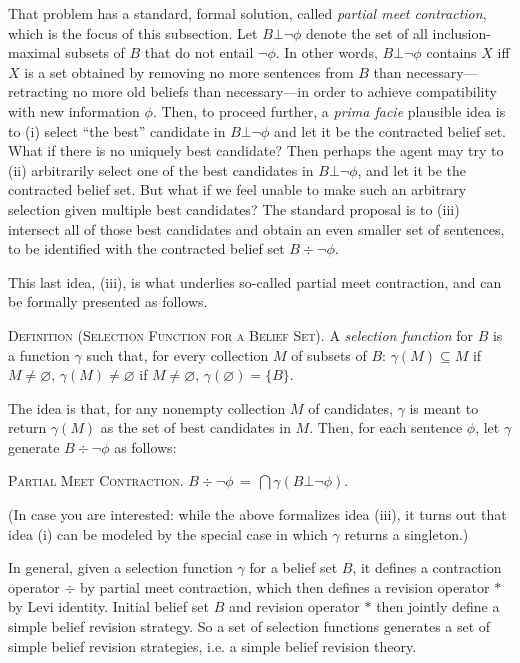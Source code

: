 That problem has a standard, formal solution, called {\em partial meet contraction}, which is the focus of this subsection. Let $B \bot \neg\phi$ denote the set of all inclusion-maximal subsets of $B$ that do not entail $\neg\phi$. In other words, $B \bot \neg\phi$ contains $X$ iff $X$ is a set obtained by removing no more sentences from $B$ than necessary---retracting no more old beliefs than necessary---in order to achieve compatibility with new information $\phi$. Then, to proceed further, a {\em prima facie} plausible idea is to (i) select ``the best'' candidate in $B \bot \neg\phi$ and let it be the contracted belief set.  What if there is no uniquely best candidate? Then perhaps the agent may try to (ii) arbitrarily select one of the best candidates in $B \bot \neg\phi$, and let it be the contracted belief set. But what if we feel unable to make such an arbitrary selection given multiple best candidates? The standard proposal is to (iii) intersect all of those best candidates and obtain an even smaller set of sentences, to be identified with the contracted belief set $B \div \neg\phi$.

This last idea, (iii), is what underlies so-called partial meet contraction, and can be formally presented as follows. \op

	\xm \textsc{Definition (Selection Function for a Belief Set).} A {\em selection function} for $B$ is a function $\gamma$ such that, for every collection $M$ of subsets of $B$: \op
		\im[(a)] $\gamma(M) \subseteq M$ if $M \neq \varnothing$,
		\im[(b)] $\gamma(M) \neq \varnothing$ if $M \neq \varnothing$,
		\im[(c)] $\gamma(\varnothing) = \{B\}$. 
	\ed

\ed The idea is that, for any nonempty collection $M$ of candidates, $\gamma$ is meant to return $\gamma(M)$ as the set of best candidates in $M$. Then, for each sentence $\phi$, let $\gamma$ generate $B \div \neg \phi$ as follows:\op

\xm \textsc{Partial Meet Contraction.} $B \div \neg \phi \,=\, \bigcap\gamma(B\bot\neg\phi)$.

\ed (In case you are interested: while the above formalizes idea (iii), it turns out that idea (i) can be modeled by the special case in which $\gamma$ returns a singleton.)

In general, given a selection function $\gamma$ for a belief set $B$, it defines a contraction operator $\div$ by partial meet contraction, which then defines a revision operator $*$ by Levi identity. Initial belief set $B$ and revision operator $*$ then jointly define a simple belief revision strategy. So a set of selection functions generates a set of simple belief revision strategies, i.e. a simple belief revision theory.

